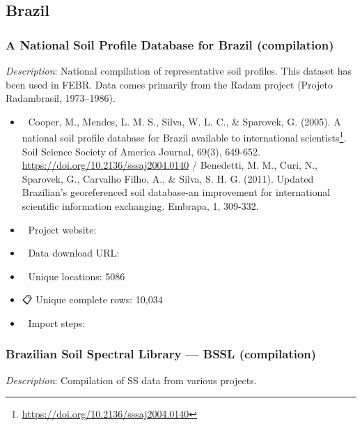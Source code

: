 \documentclass[
  graybox,natbib,nospthms]{svmono}
\providecommand{\tightlist}{%
  \setlength{\itemsep}{0pt}\setlength{\parskip}{0pt}}
\providecommand{\tightlist}{\setlength{\itemsep}{0pt}\setlength{\parskip}{0pt}}
\renewcommand{\href}[2]{#2 (\url{#1})}
\renewcommand{\href}[2]{#2\footnote{\url{#1}}}
\begin{document}
\hypertarget{brazil}{%
\subsection{Brazil}\label{brazil}}

\hypertarget{a-national-soil-profile-database-for-brazil-compilation}{%
\subsubsection{A National Soil Profile Database for Brazil (compilation)}\label{a-national-soil-profile-database-for-brazil-compilation}}

\emph{Description}: National compilation of representative soil profiles. This dataset has been
used in FEBR. Data comes primarily from the Radam project (Projeto Radambrasil, 1973--1986).

\begin{itemize}
\tightlist
\item
  📕 Cooper, M., Mendes, L. M. S., Silva, W. L. C., \& Sparovek, G. (2005). \href{https://doi.org/10.2136/sssaj2004.0140}{A national soil profile database for Brazil available to international scientists}. Soil Science Society of America Journal, 69(3), 649-652. \url{https://doi.org/10.2136/sssaj2004.0140} / Benedetti, M. M., Curi, N., Sparovek, G., Carvalho Filho, A., \& Silva, S. H. G. (2011). Updated Brazilian's georeferenced soil database-an improvement for international scientific information exchanging. Embrapa, 1, 309-332.\\
\item
  🔗 Project website:\\
\item
  📂 Data download URL:\\
\item
  📍 Unique locations: 5086\\
\item
  📋 Unique complete rows: 10,034\\
\item
  📝 Import steps:
\end{itemize}

\hypertarget{brazilian-soil-spectral-library-bssl-compilation}{%
\subsubsection{Brazilian Soil Spectral Library --- BSSL (compilation)}\label{brazilian-soil-spectral-library-bssl-compilation}}

\emph{Description}: Compilation of SS data from various projects.
\end{document}
